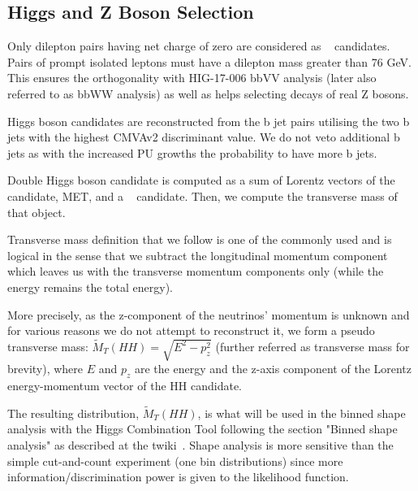 \subsection{Higgs and Z Boson Selection}

Only dilepton pairs having net charge of zero are considered as \ZtoLL~ candidates. 
Pairs of prompt isolated leptons must have a dilepton mass greater than 76 GeV. This ensures the orthogonality with HIG-17-006 bbVV analysis (later also referred to as bbWW analysis) as well as helps selecting decays of real Z bosons.

Higgs boson candidates are reconstructed from the b jet pairs utilising the two b jets with the highest CMVAv2 discriminant value. We do not veto additional b jets as with the increased PU growths the probability to have more b jets. 

Double Higgs boson candidate is computed as a sum of Lorentz vectors of the \ZtoLL~ candidate, MET, and a \HBB~ candidate. Then, we compute the transverse mass of that object. 

Transverse mass definition that we follow is one of the commonly used and is logical in the sense that we subtract the longitudinal momentum component which leaves us with the transverse momentum components only (while the energy remains the total energy).

More precisely, as the z-component of the neutrinos' momentum is unknown and for various reasons we do not attempt to reconstruct it, we form a pseudo transverse mass: $\tilde{M}_T(HH) = \sqrt{E^2 - p_{z}^2}$ (further referred as transverse mass for brevity), where $E$ and $p_z$ are the energy and the z-axis component of the Lorentz energy-momentum vector of the HH candidate.

The resulting distribution, $\tilde{M}_T(HH)$, is what will be used in the binned shape analysis with the Higgs Combination Tool following the section "Binned shape analysis" as described at the twiki~\cite{CombinedLimit}. Shape analysis is more sensitive than the simple cut-and-count experiment (one bin distributions) since more information/discrimination power is given to the likelihood function. 

